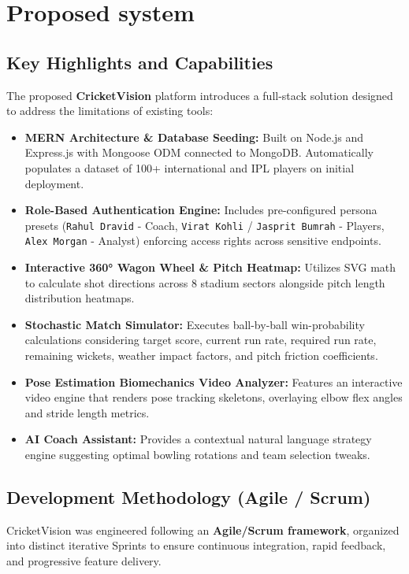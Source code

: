 \documentclass[12pt,a4paper]{report}
\begin{document}
\section{Proposed system}

\subsection{Key Highlights and Capabilities}
The proposed \textbf{CricketVision} platform introduces a full-stack solution designed to address the limitations of existing tools:

\begin{itemize}
    \item \textbf{MERN Architecture \& Database Seeding:} Built on Node.js and Express.js with Mongoose ODM connected to MongoDB. Automatically populates a dataset of 100+ international and IPL players on initial deployment.
    \item \textbf{Role-Based Authentication Engine:} Includes pre-configured persona presets (\texttt{Rahul Dravid} - Coach, \texttt{Virat Kohli} / \texttt{Jasprit Bumrah} - Players, \texttt{Alex Morgan} - Analyst) enforcing access rights across sensitive endpoints.
    \item \textbf{Interactive 360° Wagon Wheel \& Pitch Heatmap:} Utilizes SVG math to calculate shot directions across 8 stadium sectors alongside pitch length distribution heatmaps.
    \item \textbf{Stochastic Match Simulator:} Executes ball-by-ball win-probability calculations considering target score, current run rate, required run rate, remaining wickets, weather impact factors, and pitch friction coefficients.
    \item \textbf{Pose Estimation Biomechanics Video Analyzer:} Features an interactive video engine that renders pose tracking skeletons, overlaying elbow flex angles and stride length metrics.
    \item \textbf{AI Coach Assistant:} Provides a contextual natural language strategy engine suggesting optimal bowling rotations and team selection tweaks.
\end{itemize}

\subsection{Development Methodology (Agile / Scrum)}
CricketVision was engineered following an \textbf{Agile/Scrum framework}, organized into distinct iterative Sprints to ensure continuous integration, rapid feedback, and progressive feature delivery.
\end{document}
